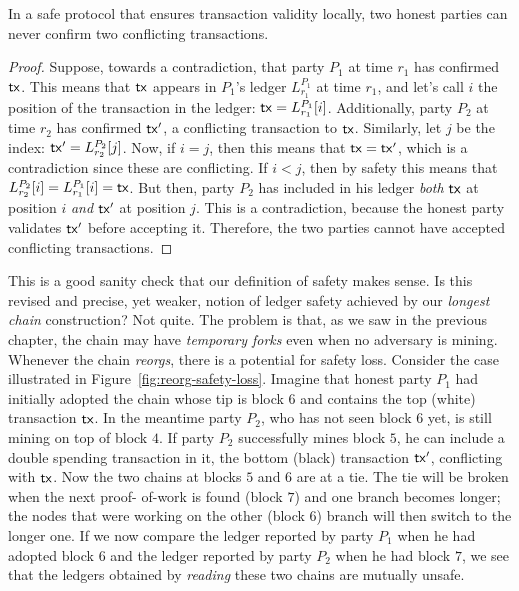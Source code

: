 \begin{lemma}
In a safe protocol that ensures transaction validity locally,
two honest parties can never confirm two conflicting transactions.
\end{lemma}
\begin{proof}
Suppose, towards a contradiction, that party $P_1$ at time $r_1$ has confirmed $\mathsf{tx}$. This means that $\mathsf{tx}$ appears in $P_1$'s
ledger $L^{P_1}_{r_1}$ at time $r_1$, and let's call $i$ the position of the transaction in the ledger: $\mathsf{tx} = L^{P_1}_{r_1}[i]$.
Additionally, party $P_2$ at time $r_2$ has confirmed $\mathsf{tx}'$, a conflicting transaction to $\mathsf{tx}$. Similarly, let $j$ be the index:
$\mathsf{tx}' = L^{P_2}_{r_2}[j]$. Now, if $i = j$, then this means that $\mathsf{tx} = \mathsf{tx}'$, which is a contradiction since these are conflicting.
If $i < j$, then by safety this means that $L^{P_2}_{r_2}[i] = L^{P_1}_{r_1}[i] = \mathsf{tx}$. But then, party $P_2$ has included
in his ledger \emph{both} $\mathsf{tx}$ at position $i$ \emph{and} $\mathsf{tx}'$ at position $j$. This is a contradiction, because the honest
party validates $\mathsf{tx}'$ before accepting it. Therefore, the two parties cannot have accepted conflicting transactions.
\end{proof}

This is a good sanity check that our definition of safety makes sense. Is this revised and precise, yet weaker, notion of ledger
safety achieved by our \emph{longest chain} construction? Not quite. The problem is that, as we saw in the previous chapter,
the chain may have \emph{temporary forks} even when no adversary is mining. Whenever the chain \emph{reorgs}, there is a
potential for safety loss. Consider the case illustrated in Figure~\ref{fig:reorg-safety-loss}. Imagine that honest party
$P_1$ had initially adopted the chain whose tip is block $6$ and contains the top (white) transaction $\mathsf{tx}$. In the meantime
party $P_2$, who has not seen block $6$ yet, is still mining on top of block $4$. If party $P_2$ successfully mines block
$5$, he can include a double spending transaction in it, the bottom (black) transaction $\mathsf{tx}'$, conflicting with $\mathsf{tx}$.
Now the two chains at blocks $5$ and $6$ are at a tie. The tie will be broken when the next proof-
of-work is found (block $7$) and one branch becomes longer; the nodes that were working on the other
(block $6$) branch will then switch to the longer one. If we now compare the ledger reported by party $P_1$ when he
had adopted block $6$ and the ledger reported by party $P_2$ when he had block $7$, we see that the
ledgers obtained by \emph{reading} these two chains are mutually unsafe.

